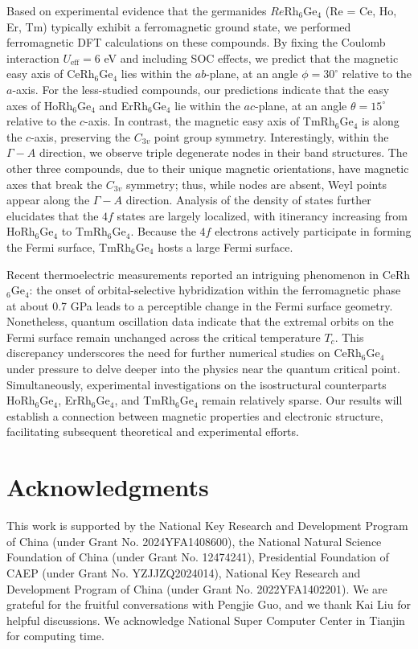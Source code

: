 \documentclass[preprint,12pt]{elsarticle}
\begin{document}
Based on experimental evidence that the germanides $Re$Rh$_6$Ge$_4$ (Re = Ce, Ho, Er, Tm) typically exhibit a ferromagnetic ground state, we performed ferromagnetic DFT calculations on these compounds. By fixing the Coulomb interaction $U_{\text{eff}} = 6$ eV and including SOC effects, we predict that the magnetic easy axis of CeRh$_6$Ge$_4$ lies within the $ab$-plane, at an angle $\phi = 30^\circ$ relative to the $a$-axis. For the less-studied compounds, our predictions indicate that the easy axes of HoRh$_6$Ge$_4$ and ErRh$_6$Ge$_4$ lie within the $ac$-plane, at an angle $\theta = 15^\circ$ relative to the $c$-axis. In contrast, the magnetic easy axis of TmRh$_6$Ge$_4$ is along the $c$-axis, preserving the $C_{3v}$ point group symmetry. Interestingly, within the $\Gamma - A$ direction, we observe triple degenerate nodes in their band structures. The other three compounds, due to their unique magnetic orientations, have magnetic axes that break the $C_{3v}$ symmetry; thus, while nodes are absent, Weyl points appear along the $\Gamma - A$ direction. Analysis of the density of states further elucidates that the $4f$ states are largely localized, with itinerancy increasing from HoRh$_6$Ge$_4$ to TmRh$_6$Ge$_4$. Because the $4f$ electrons actively participate in forming the Fermi surface, TmRh$_6$Ge$_4$ hosts a large Fermi surface.

Recent thermoelectric measurements reported an intriguing phenomenon in CeRh$_6$Ge$_4$: the onset of orbital-selective hybridization within the ferromagnetic phase at about 0.7 GPa leads to a perceptible change in the Fermi surface geometry. Nonetheless, quantum oscillation data indicate that the extremal orbits on the Fermi surface remain unchanged across the critical temperature $T_c$. This discrepancy underscores the need for further numerical studies on CeRh$_6$Ge$_4$ under pressure to delve deeper into the physics near the quantum critical point. Simultaneously, experimental investigations on the isostructural counterparts HoRh$_6$Ge$_4$, ErRh$_6$Ge$_4$, and TmRh$_6$Ge$_4$ remain relatively sparse. Our results will establish a connection between magnetic properties and electronic structure, facilitating subsequent theoretical and experimental efforts.

\section*{Acknowledgments}
This work is supported by the National Key Research and Development Program of China (under Grant No. 2024YFA1408600), the National Natural Science Foundation of China (under Grant No. 12474241), Presidential Foundation of CAEP (under Grant No. YZJJZQ2024014), National Key Research and Development Program of China (under Grant No. 2022YFA1402201). We are grateful for the fruitful conversations with Pengjie Guo, and we thank Kai Liu for helpful discussions. We acknowledge National Super Computer Center in Tianjin for computing time.

%
 

\end{document}
